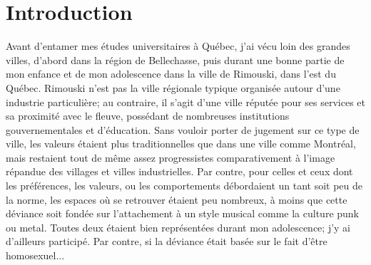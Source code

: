 \chapter*{Introduction}         %

Avant d'entamer mes études universitaires à Québec, j'ai vécu loin des grandes villes, d'abord dans la région de Bellechasse, puis durant une bonne partie de mon enfance et de mon adolescence dans la ville de Rimouski, dans l'est du Québec.
Rimouski n'est pas la ville régionale typique organisée autour d'une industrie particulière; au contraire, il s'agit d'une ville réputée pour ses services et sa proximité avec le fleuve, possédant de nombreuses institutions gouvernementales et d'éducation.
Sans vouloir porter de jugement sur ce type de ville, les valeurs étaient plus traditionnelles que dans une ville comme Montréal, mais restaient tout de même assez progressistes comparativement à l'image répandue des villages et villes industrielles.
Par contre, pour celles et ceux dont les préférences, les valeurs, ou les comportements débordaient un tant soit peu de la norme, les espaces où se retrouver étaient peu nombreux, à moins que cette déviance soit fondée sur l'attachement à un style musical comme la culture punk ou metal.
Toutes deux étaient bien représentées durant mon adolescence; j'y ai d'ailleurs participé.
Par contre, si la déviance était basée sur le fait d'être homosexuel...

